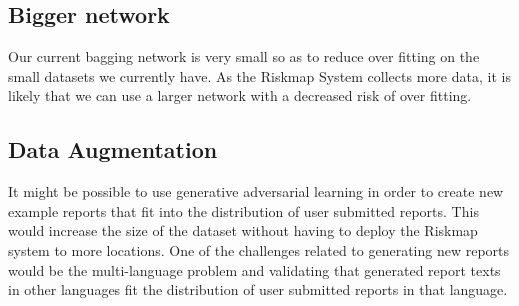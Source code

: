 \subsection{Bigger network}
Our current bagging network is very small so as to reduce over fitting on the
small datasets we currently have. As the Riskmap System collects more data, it
is likely that we can use a larger network with a decreased risk of over fitting.

\subsection{Data Augmentation}
It might be possible to use generative adversarial learning in order to create
new example reports that fit into the distribution of user submitted reports.
This would increase the size of the dataset without having to deploy the
Riskmap system to more locations. One of the challenges related to
generating new reports would be the multi-language problem and validating
that generated report texts in other languages fit the distribution of user
submitted reports in that language.